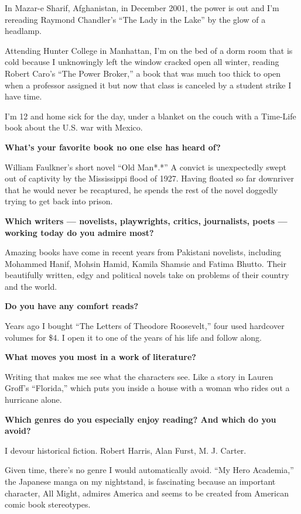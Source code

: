 In Mazar-e Sharif, Afghanistan, in December 2001, the power is out and
I'm rereading Raymond Chandler's ``The Lady in the Lake'' by the glow of
a headlamp.

Attending Hunter College in Manhattan, I'm on the bed of a dorm room
that is cold because I unknowingly left the window cracked open all
winter, reading Robert Caro's ``The Power Broker,'' a book that was much
too thick to open when a professor assigned it but now that class is
canceled by a student strike I have time.

I'm 12 and home sick for the day, under a blanket on the couch with a
Time-Life book about the U.S. war with Mexico.

\textbf{What's your favorite book no one else has heard of?}

William Faulkner's short novel ``Old Man*.*'' A convict is unexpectedly
swept out of captivity by the Mississippi flood of 1927. Having floated
so far downriver that he would never be recaptured, he spends the rest
of the novel doggedly trying to get back into prison.

\textbf{Which writers --- novelists, playwrights, critics, journalists,
poets --- working today do you admire most?}

Amazing books have come in recent years from Pakistani novelists,
including Mohammed Hanif, Mohsin Hamid, Kamila Shamsie and Fatima
Bhutto. Their beautifully written, edgy and political novels take on
problems of their country and the world.

\textbf{Do you have any comfort reads?}

Years ago I bought ``The Letters of Theodore Roosevelt,'' four used
hardcover volumes for \$4. I open it to one of the years of his life and
follow along.

\textbf{What moves you most in a work of literature?}

Writing that makes me see what the characters see. Like a story in
Lauren Groff's ``Florida,'' which puts you inside a house with a woman
who rides out a hurricane alone.

\textbf{Which genres do you especially enjoy reading? And which do you
avoid?}

I devour historical fiction. Robert Harris, Alan Furst, M. J. Carter.

Given time, there's no genre I would automatically avoid. ``My Hero
Academia,'' the Japanese manga on my nightstand, is fascinating because
an important character, All Might, admires America and seems to be
created from American comic book stereotypes.

